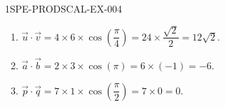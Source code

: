 \begin{corrige}{1SPE-PRODSCAL-EX-004}
\begin{enumerate}
\item $\vec{u} \cdot \vec{v} = 4 \times 6 \times \cos\!\left(\dfrac{\pi}{4}\right) = 24 \times \dfrac{\sqrt{2}}{2} = 12\sqrt{2}$.
\item $\vec{a} \cdot \vec{b} = 2 \times 3 \times \cos(\pi) = 6 \times (-1) = -6$.
\item $\vec{p} \cdot \vec{q} = 7 \times 1 \times \cos\!\left(\dfrac{\pi}{2}\right) = 7 \times 0 = 0$.
\end{enumerate}
\end{corrige}
